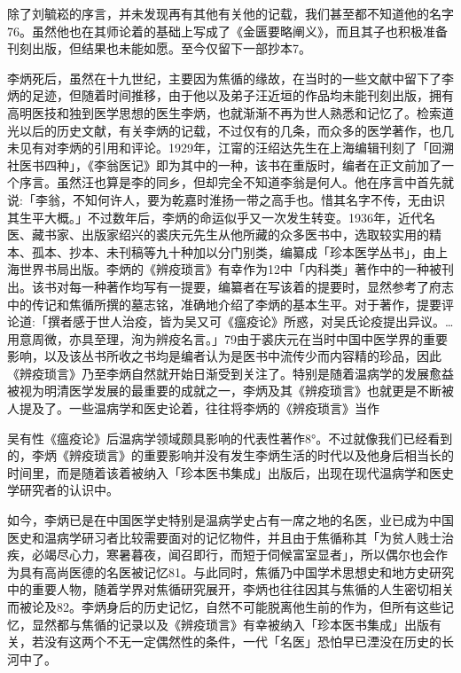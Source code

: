 \noindent 除了刘毓崧的序言，并未发现再有其他有关他的记载，我们甚至都不知道他的名字76。虽然他也在其师论着的基础上写成了《金匮要略阐义》，而且其子也积极准备刊刻出版，但结果也未能如愿。至今仅留下一部抄本7。

李炳死后，虽然在十九世纪，主要因为焦循的缘故，在当时的一些文献中留下了李炳的足迹，但随着时间推移，由于他以及弟子汪近垣的作品均未能刊刻出版，拥有高明医技和独到医学思想的医生李炳，也就渐渐不再为世人熟悉和记忆了。检索道光以后的历史文献，有关李炳的记载，不过仅有的几条，而众多的医学著作，也几未见有对李炳的引用和评论。1929年，江甯的汪绍达先生在上海编辑刊刻了「回溯社医书四种」，《李翁医记》即为其中的一种，该书在重版时，编者在正文前加了一个序言。虽然汪也算是李的同乡，但却完全不知道李翁是何人。他在序言中首先就说:「李翁，不知何许人，要为乾嘉时淮扬一带之高手也。惜其名字不传，无由识其生平大概。」不过数年后，李炳的命运似乎又一次发生转变。1936年，近代名医、藏书家、出版家绍兴的裘庆元先生从他所藏的众多医书中，选取较实用的精本、孤本、抄本、未刊稿等九十种加以分门别类，编纂成「珍本医学丛书」，由上海世界书局出版。李炳的《辨疫琐言》有幸作为12中「内科类」著作中的一种被刊出。该书对每一种著作均写有一提要，编纂者在写该着的提要时，显然参考了府志中的传记和焦循所撰的墓志铭，准确地介绍了李炳的基本生平。对于著作，提要评论道:「撰者感于世人治疫，皆为吴又可《瘟疫论》所惑，对吴氏论疫提出异议。…用意周微，亦具至理，洵为辨疫名言。」79由于裘庆元在当时中国中医学界的重要影响，以及该丛书所收之书均是编者认为是医书中流传少而内容精的珍品，因此《辨疫琐言》乃至李炳自然就开始日渐受到关注了。特别是随着温病学的发展愈益被视为明清医学发展的最重要的成就之一，李炳及其《辨疫琐言》也就更是不断被人提及了。一些温病学和医史论着，往往将李炳的《辨疫琐言》当作

\vfill
\begin{BookNotes}
\end{BookNotes}

\noindent 吴有性《瘟疫论》后温病学领域颇具影响的代表性著作8°。不过就像我们已经看到的，李炳《辨疫琐言》的重要影响并没有发生李炳生活的时代以及他身后相当长的时间里，而是随着该着被纳入「珍本医书集成」出版后，出现在现代温病学和医史学研究者的认识中。

如今，李炳已是在中国医学史特别是温病学史占有一席之地的名医，业已成为中国医史和温病学研习者比较需要面对的记忆物件，并且由于焦循称其「为贫人贱士治疾，必竭尽心力，寒暑暮夜，闻召即行，而短于伺候富室显者」，所以偶尔也会作为具有高尚医德的名医被记忆81。与此同时，焦循乃中国学术思想史和地方史研究中的重要人物，随着学界对焦循研究展开，李炳也往往因其与焦循的人生密切相关而被论及82。李炳身后的历史记忆，自然不可能脱离他生前的作为，但所有这些记忆，显然都与焦循的记录以及《辨疫琐言》有幸被纳入「珍本医书集成」出版有关，若没有这两个不无一定偶然性的条件，一代「名医」恐怕早已湮没在历史的长河中了。

